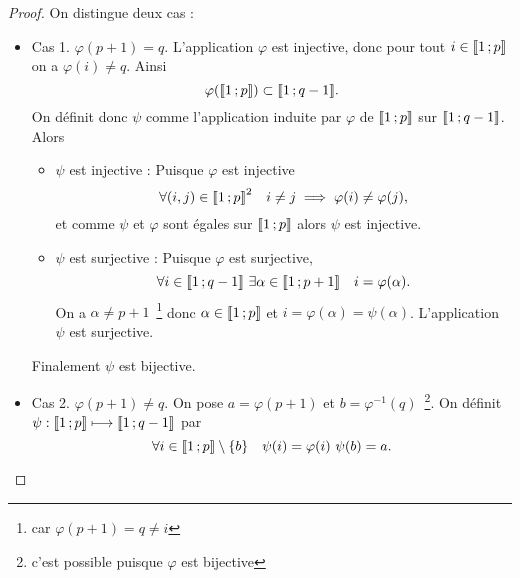 \begin{proof}
On distingue deux cas :
\begin{itemize}
\item Cas 1. \(\varphi(p+1)=q\). L'application \(\varphi\) est injective, donc pour tout \(i \in \mathopen{\llbracket}1\mathclose{}\mathpunct{};p\mathclose{\rrbracket}\) on a \(\varphi(i) \neq q\). Ainsi
  \begin{equation}
    \varphi(\mathopen{\llbracket}1\mathclose{}\mathpunct{};p\mathclose{\rrbracket}) \subset \mathopen{\llbracket}1\mathclose{}\mathpunct{};q-1\mathclose{\rrbracket}.
  \end{equation}
  On définit donc \(\psi\) comme l'application induite par \(\varphi\) de \(\mathopen{\llbracket}1\mathclose{}\mathpunct{};p\mathclose{\rrbracket}\) sur \(\mathopen{\llbracket}1\mathclose{}\mathpunct{};q-1\mathclose{\rrbracket}\). Alors
  \begin{itemize}
  \item \(\psi\) est injective : Puisque \(\varphi\) est injective
    \begin{equation}
      \forall (i, j) \in \mathopen{\llbracket}1\mathclose{}\mathpunct{};p\mathclose{\rrbracket}^2 \quad i \neq j \implies \varphi(i) \neq \varphi(j),
    \end{equation}
    et comme \(\psi\) et \(\varphi\) sont égales sur \(\mathopen{\llbracket}1\mathclose{}\mathpunct{};p\mathclose{\rrbracket}\) alors \(\psi\) est injective.
  \item \(\psi\) est surjective : Puisque \(\varphi\) est surjective,
    \begin{equation}
      \forall i \in \mathopen{\llbracket}1\mathclose{}\mathpunct{};q-1\mathclose{\rrbracket} \ \exists \alpha \in \mathopen{\llbracket}1\mathclose{}\mathpunct{};p+1\mathclose{\rrbracket} \quad i=\varphi(\alpha).
    \end{equation}
    On a \(\alpha \neq p+1\)~\footnote{car \(\varphi(p+1)=q \neq i\)} donc \(\alpha \in \mathopen{\llbracket}1\mathclose{}\mathpunct{};p\mathclose{\rrbracket}\) et \(i= \varphi(\alpha)=\psi(\alpha)\). L'application \(\psi\) est surjective.
  \end{itemize}
  Finalement \(\psi\) est bijective.
\item Cas 2. \(\varphi(p+1) \neq q\). On pose \(a=\varphi(p+1)\) et \(b=\varphi^{-1}(q)\)~\footnote{c'est possible puisque \(\varphi\) est bijective}. On définit \(    \psi :\mathopen{\llbracket}1\mathclose{}\mathpunct{};p\mathclose{\rrbracket} \longmapsto \mathopen{\llbracket}1\mathclose{}\mathpunct{};q-1\mathclose{\rrbracket}\)
  par
  \begin{equation}
    \forall i \in \mathopen{\llbracket}1\mathclose{}\mathpunct{};p\mathclose{\rrbracket} \setminus \{b\} \quad \psi(i)=\varphi(i) \ \psi(b)=a.
  \end{equation}
  

\end{itemize}
\end{proof}
